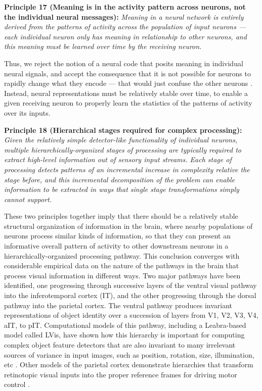\documentclass[11pt,twoside]{article}
\begin{document}
{\bf Principle 17 (Meaning is in the activity pattern across neurons,
  not the individual neural messages):} {\em Meaning in a neural
  network is entirely derived from the patterns of activity across the
  population of input neurons --- each individual neuron only has
  meaning in relationship to other neurons, and this meaning must be
  learned over time by the receiving neuron.}

Thus, we reject the notion of a neural code that posits meaning in
individual neural signals, and accept the consequence that it is not
possible for neurons to rapidly change what they encode --- that would
just confuse the other neurons \cite{OReilly10}.  Instead, neural
representations must be relatively stable over time, to enable a given
receiving neuron to properly learn the statistics of the patterns of
activity over its inputs.

{\bf Principle 18 (Hierarchical stages required for complex
  processing):} {\em Given the relatively simple detector-like
  functionality of individual neurons, multiple
  hierarchically-organized stages of processing are typically required
  to extract high-level information out of sensory input streams.
  Each stage of processing detects patterns of an incremental increase
  in complexity relative the stage before, and this incremental
  decomposition of the problem can enable information to be extracted
  in ways that single stage transformations simply cannot support.}

These two principles together imply that there should be a relatively
stable structural organization of information in the brain, where
nearby populations of neurons process similar kinds of information, so
that they can present an informative overall pattern of activity to
other downstream neurons in a hierarchically-organized processing
pathway.  This conclusion converges with considerable empirical data
on the nature of the pathways in the brain that process visual
information in different ways.  Two major pathways have been
identified, one progressing through successive layers of the ventral
visual pathway into the inferotemporal cortex (IT), and the other
progressing through the dorsal pathway into the parietal cortex.  The
ventral pathway produces invariant representations of object identity
over a succession of layers from V1, V2, V3, V4, aIT, to pIT.
Computational models of this pathway, including a Leabra-based model
called LVis, have shown how this hierarchy is important for computing
complex object feature detectors that are also invariant to many
irrelevant sources of variance in input images, such as position,
rotation, size, illumination, etc \cite{OReillyEtAlIP,PoggioModels}.
Other models of the parietal cortex demonstrate hierarchies that
transform retinotopic visual inputs into the proper reference frames
for driving motor control \cite{PougetEtAl}.
\end{document}
